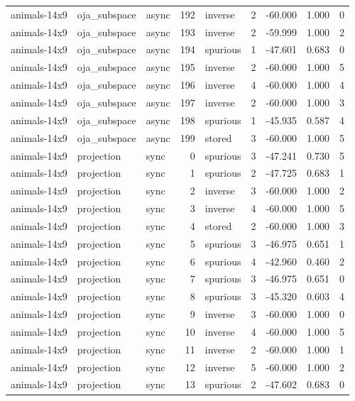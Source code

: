 \begin{tabular}{lllrlrrrr}
animals-14x9 & oja\_subspace & async & 192 & inverse & 2 & -60.000 & 1.000 & 0 \\
animals-14x9 & oja\_subspace & async & 193 & inverse & 2 & -59.999 & 1.000 & 2 \\
animals-14x9 & oja\_subspace & async & 194 & spurious & 1 & -47.601 & 0.683 & 0 \\
animals-14x9 & oja\_subspace & async & 195 & inverse & 2 & -60.000 & 1.000 & 5 \\
animals-14x9 & oja\_subspace & async & 196 & inverse & 4 & -60.000 & 1.000 & 4 \\
animals-14x9 & oja\_subspace & async & 197 & inverse & 2 & -60.000 & 1.000 & 3 \\
animals-14x9 & oja\_subspace & async & 198 & spurious & 1 & -45.935 & 0.587 & 4 \\
animals-14x9 & oja\_subspace & async & 199 & stored & 3 & -60.000 & 1.000 & 5 \\
animals-14x9 & projection & sync & 0 & spurious & 3 & -47.241 & 0.730 & 5 \\
animals-14x9 & projection & sync & 1 & spurious & 2 & -47.725 & 0.683 & 1 \\
animals-14x9 & projection & sync & 2 & inverse & 3 & -60.000 & 1.000 & 2 \\
animals-14x9 & projection & sync & 3 & inverse & 4 & -60.000 & 1.000 & 5 \\
animals-14x9 & projection & sync & 4 & stored & 2 & -60.000 & 1.000 & 3 \\
animals-14x9 & projection & sync & 5 & spurious & 3 & -46.975 & 0.651 & 1 \\
animals-14x9 & projection & sync & 6 & spurious & 4 & -42.960 & 0.460 & 2 \\
animals-14x9 & projection & sync & 7 & spurious & 3 & -46.975 & 0.651 & 0 \\
animals-14x9 & projection & sync & 8 & spurious & 3 & -45.320 & 0.603 & 4 \\
animals-14x9 & projection & sync & 9 & inverse & 3 & -60.000 & 1.000 & 0 \\
animals-14x9 & projection & sync & 10 & inverse & 4 & -60.000 & 1.000 & 5 \\
animals-14x9 & projection & sync & 11 & inverse & 2 & -60.000 & 1.000 & 1 \\
animals-14x9 & projection & sync & 12 & inverse & 5 & -60.000 & 1.000 & 2 \\
animals-14x9 & projection & sync & 13 & spurious & 2 & -47.602 & 0.683 & 0 \\

\end{tabular}
